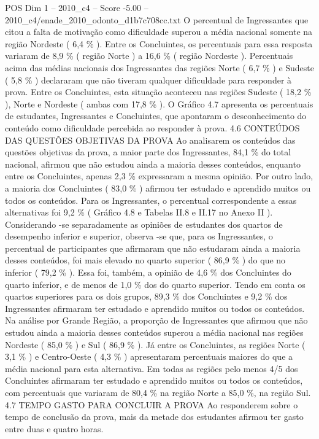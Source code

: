 \begin{textsample}{POS Dim 1 – 2010\_c4 – Score -5.00 – 2010\_c4/enade\_2010\_odonto\_d1b7c708cc.txt}
O percentual de Ingressantes que citou a falta de motivação como dificuldade superou a média nacional somente na região Nordeste ( 6,4 \% ).
Entre os Concluintes, os percentuais para essa resposta variaram de 8,9 \% ( região Norte ) a 16,6 \% ( região Nordeste ).
Percentuais acima das médias nacionais dos Ingressantes das regiões Norte ( 6,7 \% ) e Sudeste ( 5,8 \% ) declararam que não tiveram qualquer dificuldade para responder à prova.
Entre os Concluintes, esta situação aconteceu nas regiões Sudeste ( 18,2 \% ), Norte e Nordeste ( ambas com 17,8 \% ).
O Gráfico 4.7 apresenta os percentuais de estudantes, Ingressantes e Concluintes, que apontaram o desconhecimento do conteúdo como dificuldade percebida ao responder à prova. 4.6 CONTEÚDOS DAS QUESTÕES OBJETIVAS DA PROVA Ao analisarem os conteúdos das questões objetivas da prova, a maior parte dos Ingressantes, 84,1 \% do total nacional, afirmou que não estudou ainda a maioria desses conteúdos, enquanto entre os Concluintes, apenas 2,3 \% expressaram a mesma opinião.
Por outro lado, a maioria dos Concluintes ( 83,0 \% ) afirmou ter estudado e aprendido muitos ou todos os conteúdos.
Para os Ingressantes, o percentual correspondente a essas alternativas foi 9,2 \% ( Gráfico 4.8 e Tabelas II.8 e II.17 no Anexo II ).
Considerando -se separadamente as opiniões de estudantes dos quartos de desempenho inferior e superior, observa -se que, para os Ingressantes, o percentual de participantes que afirmaram que não estudaram ainda a maioria desses conteúdos, foi mais elevado no quarto superior ( 86,9 \% ) do que no inferior ( 79,2 \% ).
Essa foi, também, a opinião de 4,6 \% dos Concluintes do quarto inferior, e de menos de 1,0 \% dos do quarto superior.
Tendo em conta os quartos superiores para os dois grupos, 89,3 \% dos Concluintes e 9,2 \% dos Ingressantes afirmaram ter estudado e aprendido muitos ou todos os conteúdos.
Na análise por Grande Região, a proporção de Ingressantes que afirmou que não estudou ainda a maioria desses conteúdos superou a média nacional nas regiões Nordeste ( 85,0 \% ) e Sul ( 86,9 \% ).
Já entre os Concluintes, as regiões Norte ( 3,1 \% ) e Centro-Oeste ( 4,3 \% ) apresentaram percentuais maiores do que a média nacional para esta alternativa.
Em todas as regiões pelo menos 4/5 dos Concluintes afirmaram ter estudado e aprendido muitos ou todos os conteúdos, com percentuais que variaram de 80,4 \% na região Norte a 85,0 \%, na região Sul. 4.7 TEMPO GASTO PARA CONCLUIR A PROVA Ao responderem sobre o tempo de conclusão da prova, mais da metade dos estudantes afirmou ter gasto entre duas e quatro horas.

\end{textsample}
